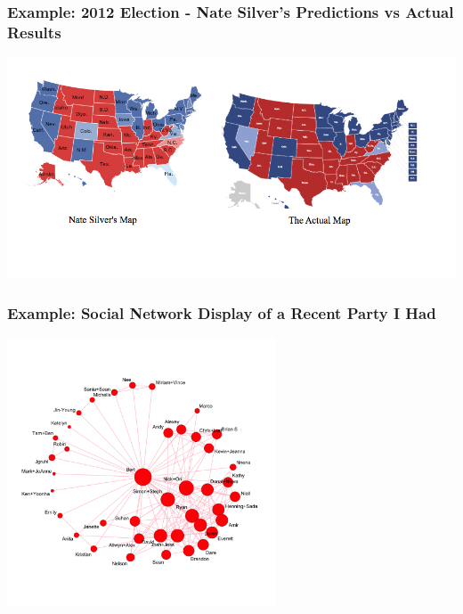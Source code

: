 \documentclass[handout]{beamer}
\begin{document}
\begin{frame}[fragile]
\frametitle{Example: 2012 Election - Nate Silver's Predictions vs Actual Results}
\begin{center}
\includegraphics[width=\textwidth]{figure/nate_silver.jpg}
\end{center}
\begin{center}
\end{center}
\end{frame}


\begin{frame}[fragile]
\frametitle{Example: Social Network Display of a Recent Party I Had}
\begin{center}
\includegraphics[width=8cm]{figure/network.png}
\end{center}
\end{frame}
\end{document}
